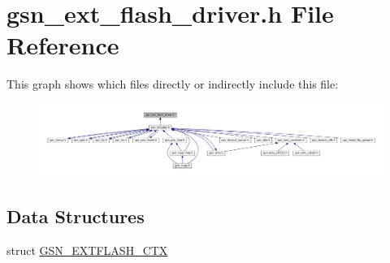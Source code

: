 \hypertarget{a00496}{
\section{gsn\_\-ext\_\-flash\_\-driver.h File Reference}
\label{a00496}
}
This graph shows which files directly or indirectly include this file:
\nopagebreak
\begin{figure}[H]
\begin{center}
\leavevmode
\includegraphics[width=400pt]{a00726}
\end{center}
\end{figure}
\subsection*{Data Structures}
\begin{DoxyCompactItemize}
\item 
struct \hyperlink{a00071}{GSN\_\-EXTFLASH\_\-CTX}
\end{DoxyCompactItemize}
